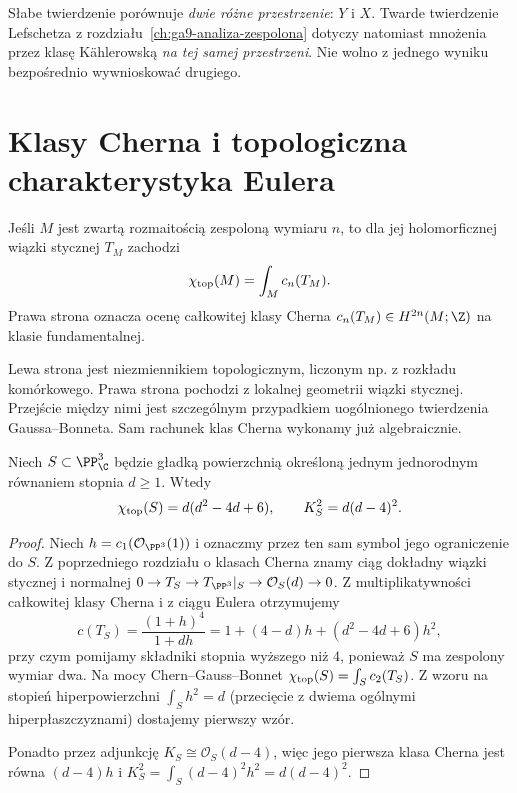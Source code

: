 \begin{uwaga}
Słabe twierdzenie porównuje \emph{dwie różne przestrzenie}:
$Y$ i $X$. Twarde twierdzenie Lefschetza z
rozdziału~\ref{ch:ga9-analiza-zespolona} dotyczy natomiast
mnożenia przez klasę Kählerowską \emph{na tej samej przestrzeni}.
Nie wolno z jednego wyniku bezpośrednio wywnioskować drugiego.
\end{uwaga}

\section{Klasy Cherna i topologiczna charakterystyka Eulera}
\label{sec:ga10-chern-euler}

\begin{twierdzenie}
\label{tw:ga10-cgb}
Jeśli $M$ jest zwartą rozmaitością zespoloną wymiaru $n$,
to dla jej holomorficznej wiązki stycznej $T_M$ zachodzi
\[
 \chi_{\rm top}(M)=\int_M c_n(T_M).
\]
Prawa strona oznacza ocenę całkowitej klasy Cherna
$c_n(T_M)\in H^{2n}(M;\Z)$ na klasie fundamentalnej.
\end{twierdzenie}

\begin{uwaga}
Lewa strona jest niezmiennikiem topologicznym,
liczonym np. z rozkładu komórkowego. Prawa strona
pochodzi z lokalnej geometrii wiązki stycznej.
Przejście między nimi jest szczególnym przypadkiem
uogólnionego twierdzenia Gaussa--Bonneta.
Sam rachunek klas Cherna wykonamy już algebraicznie.
\end{uwaga}

\begin{twierdzenie}
\label{tw:ga10-surface-euler}
Niech $S\subset\PP^3_\C$ będzie gładką powierzchnią
określoną jednym jednorodnym równaniem stopnia $d\ge1$.
Wtedy
\[
 \chi_{\rm top}(S)=d(d^2-4d+6),\qquad
 K_S^2=d(d-4)^2.
\]
\end{twierdzenie}
\begin{proof}
Niech $h=c_1(\mathcal O_{\PP^3}(1))$ i oznaczmy przez ten sam
symbol jego ograniczenie do $S$.
Z poprzedniego rozdziału o klasach Cherna znamy ciąg dokładny
wiązki stycznej i normalnej
$0\to T_S\to T_{\PP^3}|_S\to\mathcal O_S(d)\to0$.
Z multiplikatywności całkowitej klasy Cherna i z ciągu Eulera
otrzymujemy
\[
 c(T_S)=\frac{(1+h)^4}{1+dh}
 =1+(4-d)h+(d^2-4d+6)h^2,
\]
przy czym pomijamy składniki stopnia wyższego niż $4$,
ponieważ $S$ ma zespolony wymiar dwa.
Na mocy Chern--Gauss--Bonnet
$\chi_{\rm top}(S)=\int_S c_2(T_S)$.
Z wzoru na stopień hiperpowierzchni
$\int_S h^2=d$ (przecięcie z dwiema ogólnymi
hiperpłaszczyznami) dostajemy pierwszy wzór.

Ponadto przez adjunkcję
$K_S\cong\mathcal O_S(d-4)$, więc jego pierwsza
klasa Cherna jest równa $(d-4)h$ i
$K_S^2=\int_S (d-4)^2h^2=d(d-4)^2$.
\end{proof}

